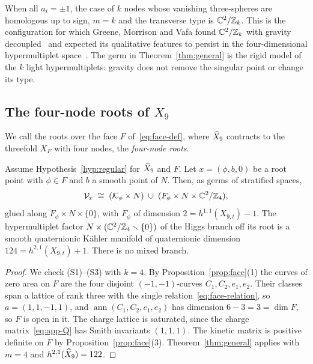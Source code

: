 When all $a_i=\pm1$, the case of $k$ nodes whose vanishing three-spheres are homologous up to
sign, $m=k$ and the transverse type is $\mathbb C^2/\mathbb Z_k$. This is the configuration for which
Greene, Morrison and Vafa found $\mathbb C^2/\mathbb Z_k$ with gravity decoupled~\cite[Sect.~3,
eqs.~(3.13)--(3.18)]{Greene:1996Confinement} and expected its qualitative features to persist in
the four-dimensional hypermultiplet space~\cite[Sect.~6]{Greene:1996Confinement}. The germ in
Theorem~\ref{thm:general} is the rigid model of the $k$ light hypermultiplets: gravity does not
remove the singular point or change its type.

\subsection{The four-node roots of \texorpdfstring{$X_9$}{X9}}
\label{subsec:four-node}

We call the roots over the face $F$ of~\eqref{eq:face-def}, where $\widehat X_9$ contracts to the
threefold $X_F$ with four nodes, the \emph{four-node roots}.

\begin{theorem}\label{thm:four-node}
Assume Hypothesis~\ref{hyp:regular} for $\widehat X_9$ and $F$. Let $x=(\phi,b,0)$ be a root point
with $\phi\in F$ and $b$ a smooth point of $N$. Then, as germs of stratified spaces,
\begin{equation}
 \mathcal V_x\;\cong\;(\mathcal K_\phi\times N)\;\cup\;
 (F_\phi\times N\times\mathbb C^2/\mathbb Z_4),
 \label{eq:thm-four-node}
\end{equation}
glued along $F_\phi\times N\times\{0\}$, with $F_\phi$ of dimension $2=h^{1,1}(X_{9,t})-1$. The
hypermultiplet factor $N\times(\mathbb C^2/\mathbb Z_4\smallsetminus\{0\})$ of the Higgs branch off its root is
a smooth quaternionic K\"ahler manifold of quaternionic dimension $124=h^{2,1}(X_{9,t})+1$. There
is no mixed branch.
\end{theorem}

\begin{proof}
We check (S1)--(S3) with $k=4$. By Proposition~\ref{prop:face}(1) the curves of zero area on
$F$ are the four disjoint $(-1,-1)$-curves $C_1,C_2,e_1,e_2$. Their classes span a lattice of
rank three with the single relation~\eqref{eq:face-relation}, so $a=(1,1,-1,1)$, and
$\operatorname{ann}(C_1,C_2,e_1,e_2)$ has dimension $6-3=3=\dim F$, so $F$ is open in it. The
charge lattice is saturated, since the charge matrix~\eqref{eq:app-Q} has Smith invariants
$(1,1,1)$. The kinetic matrix is positive definite on $F$ by Proposition~\ref{prop:face}(3).
Theorem~\ref{thm:general} applies with $m=4$ and $h^{2,1}(\widehat X_9)=122$.
\end{proof}

